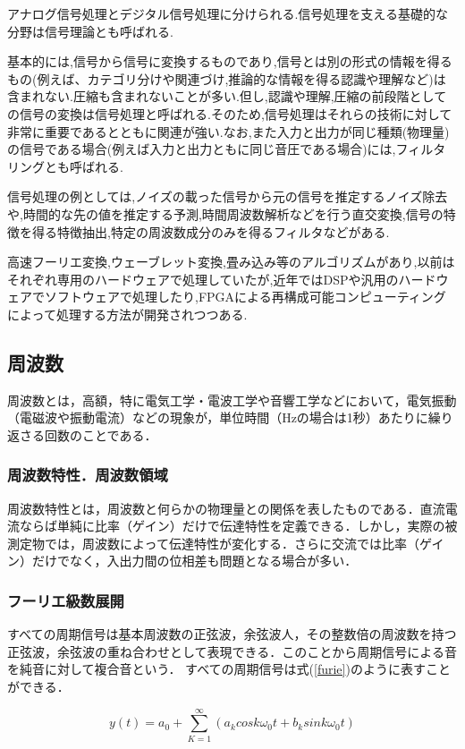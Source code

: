 \documentclass[a4j,11pt]{jsarticle}
\begin{document}
アナログ信号処理とデジタル信号処理に分けられる.信号処理を支える基礎的な分野は信号理論とも呼ばれる.

基本的には,信号から信号に変換するものであり,信号とは別の形式の情報を得るもの(例えば、カテゴリ分けや関連づけ,推論的な情報を得る認識や理解など)は含まれない.圧縮も含まれないことが多い.但し,認識や理解,圧縮の前段階としての信号の変換は信号処理と呼ばれる.そのため,信号処理はそれらの技術に対して非常に重要であるとともに関連が強い.なお,また入力と出力が同じ種類(物理量)の信号である場合(例えば入力と出力ともに同じ音圧である場合)には,フィルタリングとも呼ばれる.

信号処理の例としては,ノイズの載った信号から元の信号を推定するノイズ除去や,時間的な先の値を推定する予測,時間周波数解析などを行う直交変換,信号の特徴を得る特徴抽出,特定の周波数成分のみを得るフィルタなどがある.

高速フーリエ変換,ウェーブレット変換,畳み込み等のアルゴリズムがあり,以前はそれぞれ専用のハードウェアで処理していたが,近年ではDSPや汎用のハードウェアでソフトウェアで処理したり,FPGAによる再構成可能コンピューティングによって処理する方法が開発されつつある.


\subsection{周波数}
周波数とは，高額，特に電気工学・電波工学や音響工学などにおいて，電気振動（電磁波や振動電流）などの現象が，単位時間（Hzの場合は1秒）あたりに繰り返さる回数のことである．
\subsubsection{周波数特性．周波数領域}
周波数特性とは，周波数と何らかの物理量との関係を表したものである．直流電流ならば単純に比率（ゲイン）だけで伝達特性を定義できる．しかし，実際の被測定物では，周波数によって伝達特性が変化する．さらに交流では比率（ゲイン）だけでなく，入出力間の位相差も問題となる場合が多い．
\subsubsection{フーリエ級数展開}
すべての周期信号は基本周波数の正弦波，余弦波人，その整数倍の周波数を持つ正弦波，余弦波の重ね合わせとして表現できる．このことから周期信号による音を純音に対して複合音という．
すべての周期信号は式(\ref{furie})のように表すことができる．

\begin{equation}
	\label{furie}
  y(t) = a_{0} + \sum^{\infty}_{K=1} (a_{k}cos k\omega_{0}t +  b_{k}sin k\omega_{0}t) 
\end{equation}
\end{document}
